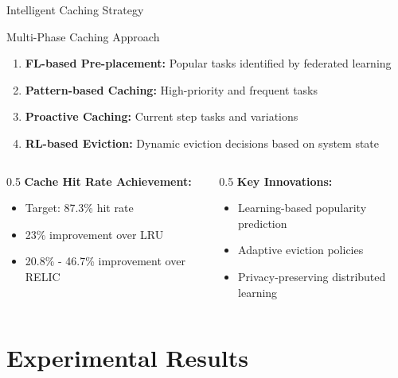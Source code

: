 \documentclass[aspectratio=169]{beamer}
\begin{document}
\begin{frame}{Intelligent Caching Strategy}
\begin{block}{Multi-Phase Caching Approach}
\begin{enumerate}
\item \textbf{FL-based Pre-placement:} Popular tasks identified by federated learning
\item \textbf{Pattern-based Caching:} High-priority and frequent tasks
\item \textbf{Proactive Caching:} Current step tasks and variations
\item \textbf{RL-based Eviction:} Dynamic eviction decisions based on system state
\end{enumerate}
\end{block}

\begin{columns}
\begin{column}{0.5\textwidth}
\textbf{Cache Hit Rate Achievement:}
\begin{itemize}
\item Target: 87.3\% hit rate
\item 23\% improvement over LRU
\item 20.8\% - 46.7\% improvement over RELIC
\end{itemize}
\end{column}
\begin{column}{0.5\textwidth}
\textbf{Key Innovations:}
\begin{itemize}
\item Learning-based popularity prediction
\item Adaptive eviction policies
\item Privacy-preserving distributed learning
\end{itemize}
\end{column}
\end{columns}
\end{frame}

\section{Experimental Results}
\end{document}
